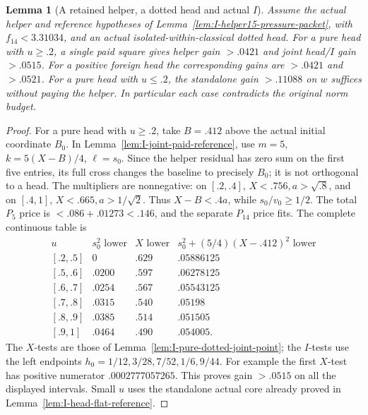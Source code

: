 \documentclass[11pt]{article}
\newtheorem{lemma}[theorem]{Lemma}
\theoremstyle{definition}
\theoremstyle{remark}
\begin{document}
\begin{lemma}[A retained helper, a dotted head and actual \(I\)]
\label{lem:I-helper15-head-coupling}
Assume the actual helper and reference hypotheses of
Lemma~\ref{lem:I-helper15-pressure-packet}, with \(f_{14}<3.31034\),
and an actual isolated-within-classical dotted head. For a pure head
with \(u\ge.2\), a single paid square gives helper gain \(>.0421\)
and joint head/\(I\) gain \(>.0515\). For a positive foreign head
the corresponding gains are \(>.0421\) and \(>.0521\).
For a pure head with \(u\le.2\), the standalone gain \(>.11088\)
on \(w\) suffices without paying the helper.
In particular each case contradicts the original norm budget.
\end{lemma}
\begin{proof}
For a pure head with \(u\ge.2\), take \(B=.412\) above the actual
initial coordinate \(B_0\). In
Lemma~\ref{lem:I-joint-paid-reference}, use \(m=5\),
\(k=5(X-B)/4\), \(\ell=s_0\). Since the helper residual has
zero sum on the first five entries, its full cross changes the
baseline to precisely \(B_0\); it is not orthogonal to a head.
The multipliers are nonnegative: on \([.2,.4]\),
\(X<.756,a>\sqrt{.8}\), and on \([.4,1]\),
\(X<.665,a>1/\sqrt2\). Thus \(X-B<.4a\), while
\(s_0/v_0\ge1/2\). The total \(P_5\) price is
\(<.086+.01273<.146\), and the separate \(P_{14}\) price fits.
The complete continuous table is
\[
\begin{array}{c|c|c|c}
u&s_0^2\text{ lower}&X\text{ lower}&
 s_0^2+(5/4)(X-.412)^2\text{ lower}\\ \hline
{}[.2,.5]&0&.629&.05886125\\
{}[.5,.6]&.0200&.597&.06278125\\
{}[.6,.7]&.0254&.567&.05543125\\
{}[.7,.8]&.0315&.540&.05198\\
{}[.8,.9]&.0385&.514&.051505\\
{}[.9,1]&.0464&.490&.054005 .
\end{array}
\]
The \(X\)-tests are those of
Lemma~\ref{lem:I-pure-dotted-joint-point}; the \(I\)-tests use
the left endpoints \(h_0=1/12,3/28,7/52,1/6,9/44\).
For example the first \(X\)-test has positive numerator
\(.0002777057265\). This proves gain \(>.0515\) on all the
displayed intervals. Small \(u\) uses the standalone actual core
already proved in Lemma~\ref{lem:I-head-flat-reference}.


\end{proof}
\end{document}
